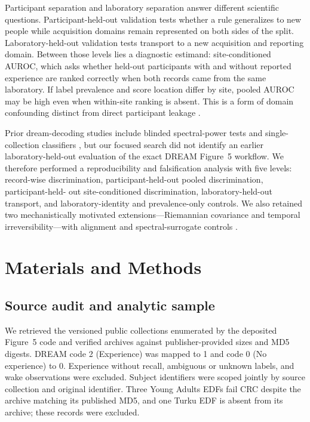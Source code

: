 \documentclass[10pt,twocolumn]{article}
\begin{document}
Participant separation and laboratory separation answer different scientific
questions. Participant-held-out validation tests whether a rule generalizes
to new people while acquisition domains remain represented on both sides of
the split. Laboratory-held-out validation tests transport to a new acquisition
and reporting domain. Between those levels lies a diagnostic estimand:
site-conditioned AUROC, which asks whether held-out participants with and
without reported experience are ranked correctly when both records came from
the same laboratory. If label prevalence and score location differ by site,
pooled AUROC may be high even when within-site ranking is absent. This is a
form of domain confounding distinct from direct participant leakage
\citep{varoquaux2018crossvalidation,kapoor2023leakage}.

Prior dream-decoding studies include blinded spectral-power tests and
single-collection classifiers \citep{wong2020catcher,moctezuma2025unlocking},
but our focused search did not identify an earlier laboratory-held-out
evaluation of the exact DREAM Figure~5 workflow. We therefore performed a
reproducibility and falsification analysis with five levels: record-wise
discrimination, participant-held-out pooled discrimination, participant-held-
out site-conditioned discrimination, laboratory-held-out transport, and
laboratory-identity and prevalence-only controls. We also retained two
mechanistically motivated extensions---Riemannian covariance and temporal
irreversibility---with alignment and spectral-surrogate controls
\citep{barachant2012riemann,zanini2018transfer,delafuente2023time}.

\section{Materials and Methods}

\subsection{Source audit and analytic sample}

We retrieved the versioned public collections enumerated by the deposited
Figure~5 code and verified archives against publisher-provided sizes and MD5
digests. DREAM code 2 (Experience) was mapped to 1 and code 0 (No experience)
to 0. Experience without recall, ambiguous or unknown labels, and wake
observations were excluded. Subject identifiers were scoped jointly by source
collection and original identifier. Three Young Adults EDFs fail CRC despite
the archive matching its published MD5, and one Turku EDF is absent from its
archive; these records were excluded.
\end{document}
